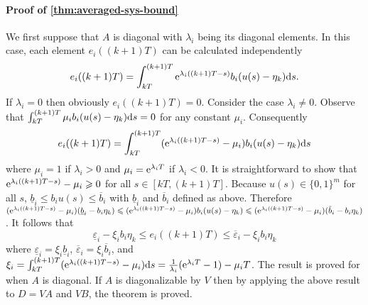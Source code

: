 
\paragraph*{Proof of \protect\cref{thm:averaged-sys-bound}}

  We first suppose that $A$ is diagonal with $\lambda_{i}$ being its diagonal elements.
  In this case, each element $e_i ((k + 1) T)$ can be calculated
  independently
  \[ e_i ((k + 1) T) = \int_{kT}^{(k + 1) T} \mathrm{e}^{\lambda_i ((k + 1) T - s)} b_i 
     (u (s) - \eta_k) \mathrm{d} s \text{.} \]
  If $\lambda_i = 0$ then obviously \( e_i ((k + 1) T) = 0 \).
  Consider the case $\lambda_i \neq 0$. Observe that $\int_{kT}^{(k + 1) T} \mu_i b_i  (u (s)
  - \eta_k) \mathrm{d} s = 0$ for any constant $\mu_i$. Consequently
  \[ e_i ((k + 1) T) = \int_{kT}^{(k + 1) T} (\mathrm{e}^{\lambda_i ((k + 1) T - s)} -
     \mu_i ) b_i  (u (s) - \eta_k) \mathrm{d} s \]
  where $\mu_i = 1$ if $\lambda_i > 0$ and $\mu_i = \mathrm{e}^{\lambda_i T}$ if $\lambda_i
  < 0$. It is straightforward to show that $\mathrm{e}^{\lambda_i ((k + 1) T - s)} -
  \mu_i \geqslant 0$ for all $s \in [kT, (k + 1) T]$. Because $u (s) \in
  \{ 0, 1 \}^m$ for all $s$, $\underline{b}_i \leqslant b_i u (s)
  \leqslant \overbar{b}_i$ with $\underline{b}_i$ and
  $\overbar{b}_i$ defined as above. Therefore $(\mathe^{\lambda_i ((k +
  1) T - s)} - \mu_i )  (\underline{b}_i - b_i \eta_k) \leqslant
  (\mathe^{\lambda_i ((k + 1) T - s)} - \mu_i ) b_i  (u (s) - \eta_k) \leqslant
  (\mathe^{\lambda_i ((k + 1) T - s)} - \mu_i )  (\overbar{b}_i - b_i
  \eta_k)$. It follows that
  \[ \underline{\varepsilon}_i - \xi_i b_i \eta_k \leqslant 
  e_i ((k + 1) T)
  \leqslant \overbar{\varepsilon}_i - \xi_i b_i \eta_k \]
  where $\underline{\varepsilon}_{i} = \xi_{i} \underline{b}_{i}$, $\overbar{\varepsilon}_{i} = \xi_{i} \overbar{b}_{i}$, and $\xi_i = \int_{kT}^{(k + 1) T} (\mathrm{e}^{\lambda_i ((k + 1) T - s)} -
  \mu_i ) \mathrm{d} s = \frac{1}{\lambda_i} (\mathrm{e}^{\lambda_i T} - 1) - \mu_i T$.
  The result is proved for when $A$ is diagonal.
  If $A$ is diagonalizable by $V$ then by applying the above result to $D = V A$ and $V B$, the theorem is proved.

